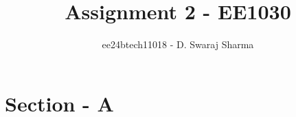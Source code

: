 \documentclass[journal]{IEEEtran}
\begin{document}

\vspace{3cm}

\title{Assignment 2 - EE1030}
\author{ee24btech11018 - D. Swaraj Sharma}

{\let\newpage\relax\maketitle}
\renewcommand{\thefigure}{\theenumi}
\renewcommand{\thetable}{\theenumi}
\setlength{\intextsep}{10pt}
\renewcommand{\thetable}{\theenumi}
\section{Section - A}
\end{document}
